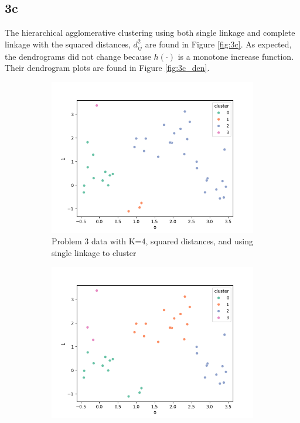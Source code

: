 \documentclass[12pt]{article}
\begin{document}
\newpage


\subsection*{3c}
The hierarchical agglomerative clustering using both single linkage and complete linkage with the squared distances, $d_{ij}^2$ are found in Figure \ref{fig:3c}. As expected, the dendrograms did not change because $h(\cdot)$ is a monotone increase function. Their dendrogram plots are found in Figure \ref{fig:3c_den}.

\begin{figure}[ht!]
    \begin{subfigure}{0.5\textwidth}
        \centering
        \includegraphics[width=\linewidth]{../plots/single_squared.png}
        \caption{Problem 3 data with K=4, squared distances, and using single linkage to cluster}
        \label{fig:single_squared}
    \end{subfigure}
    \begin{subfigure}{0.5\textwidth}
        \centering
        \includegraphics[width=\linewidth]{../plots/complete_squared.png}

\end{subfigure}
\end{figure}
\end{document}
